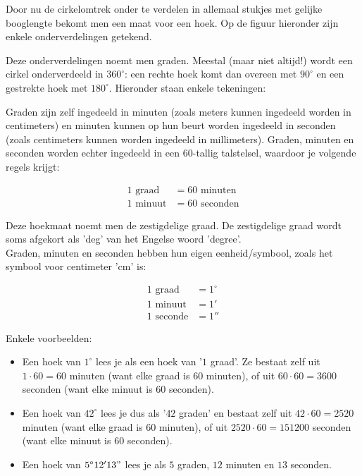 \begin{figure}[H]
	\centering 
	 
\end{figure}

Door nu de cirkelomtrek onder te verdelen in allemaal stukjes met gelijke booglengte bekomt men een maat voor een hoek. Op de figuur hieronder zijn enkele onderverdelingen getekend.

\begin{figure}[H]
	\centering 
	 
\end{figure}

Deze onderverdelingen noemt men graden. Meestal (maar niet altijd!) wordt een cirkel onderverdeeld in $360^\circ$: een rechte hoek komt dan overeen met $90^\circ$ en een gestrekte hoek met $180^\circ$. Hieronder staan enkele tekeningen:

\begin{figure}[H]
	\centering 
	 
\end{figure}

Graden zijn zelf ingedeeld in minuten (zoals meters kunnen ingedeeld worden in centimeters) en minuten kunnen op hun beurt worden ingedeeld in seconden (zoals centimeters kunnen worden ingedeeld in millimeters).  Graden, minuten en seconden worden echter ingedeeld in een $60$-tallig talstelsel, waardoor je volgende regels krijgt:

\begin{align*}
	1 \textrm{ graad} &= 60 \textrm{ minuten}\\
	1 \textrm{ minuut} &= 60 \textrm{ seconden}
\end{align*}

Deze hoekmaat noemt men de zestigdelige graad. De zestigdelige graad wordt soms afgekort als 'deg' van het Engelse woord 'degree'.\\
Graden, minuten en seconden hebben hun eigen eenheid/symbool, zoals het symbool voor centimeter 'cm' is:

\begin{align*}
	1 \textrm{ graad} &= 1^\circ\\
	1 \textrm{ minuut} &= 1'\\
	1 \textrm{ seconde} &= 1''
\end{align*}

Enkele voorbeelden:

\begin{itemize}
	\item Een hoek van $1^\circ$ lees je als een hoek van '$1$ graad'. Ze bestaat zelf uit $1\cdot 60 = 60$ minuten (want elke graad is $60$ minuten), of uit $60 \cdot 60 = 3600$ seconden (want elke minuut is $60$ seconden).
	\item Een hoek van $42^\circ$ lees je dus als '$42$ graden' en bestaat zelf uit $42 \cdot 60 = 2520$ minuten (want elke graad is $60$ minuten), of uit $2520 \cdot 60 = 151200$ seconden (want elke minuut is $60$ seconden).
	\item Een hoek van $5^\circ12'13"$ lees je als $5$ graden, $12$ minuten en $13$ seconden.
\end{itemize}

